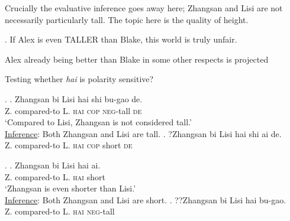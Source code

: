 \documentclass[12pt,letterpaper]{scrartcl}
\begin{document}
Crucially the evaluative inference goes away here; Zhangsan and Lisi are not necessarily particularly tall. The topic here is the quality of height.


\ex. If Alex is even TALLER than Blake, this world is truly unfair.

Alex already being better than Blake in some other respects is projected

Testing whether \textit{hai} is polarity sensitive?
    
\ex. \ag. Zhangsan bi Lisi hai shi bu-gao de. \\
    Z. compared-to L. \textsc{hai} \textsc{cop} \textsc{neg}-tall   \textsc{de} \\
    `Compared to Lisi, Zhangsan is not considered tall.' \\
    \underline{Inference}: Both Zhangsan and Lisi are tall.
    \bg. ?Zhangsan bi Lisi hai shi ai de. \\
Z. compared-to L. \textsc{hai} \textsc{cop} short   \textsc{de} \\
{}

\ex. \ag. Zhangsan bi Lisi hai ai. \\
    Z. compared-to L. \textsc{hai} short \\
    `Zhangsan is even shorter than Lisi.’ \\
    \underline{Inference}: Both Zhangsan and Lisi are short.
    \bg. ??Zhangsan bi Lisi hai bu-gao. \\
    Z. compared-to L. \textsc{hai} \textsc{neg}-tall \\
    {}


\end{document}
